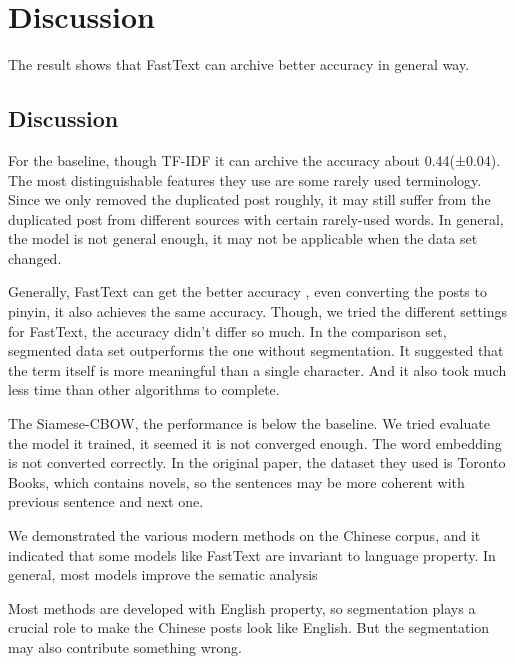 \chapter{Discussion}

The result shows that FastText can archive better accuracy in general way.

\section{Discussion}


For the baseline, though TF-IDF it can archive the accuracy about 0.44(±0.04). The most distinguishable features they use are some rarely used terminology. Since we only removed the duplicated post roughly, it may still suffer from the duplicated post from different sources with certain rarely-used words. In general, the model is not general enough, it may not be applicable when the data set changed.

Generally, FastText can get the better accuracy , even converting the posts to pinyin, it also achieves the same accuracy. Though, we tried the different settings for FastText, the accuracy didn't differ so much. In the comparison set, segmented data set outperforms the one without segmentation. It suggested that the term itself is more meaningful than a single character. And it also took much less time than other algorithms to complete.

The Siamese-CBOW, the performance is below the baseline. We tried evaluate the model it trained, it seemed it is not converged enough. The word embedding is not converted correctly. In the original paper, the dataset they used is Toronto Books, which contains novels, so the sentences may be more coherent with previous sentence and next one.


We demonstrated the various modern methods on the Chinese corpus, and it indicated that some models like FastText are invariant to language property. In general, most models improve the sematic analysis

Most methods are developed with English property, so segmentation plays a crucial role to make the Chinese posts look like English. But the segmentation may also contribute something wrong. 
